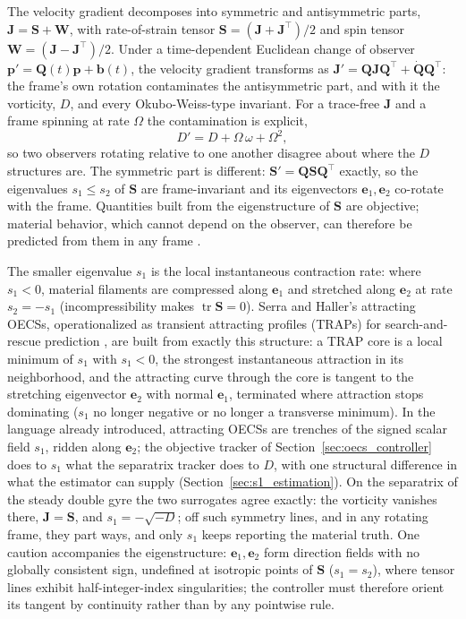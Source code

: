 \documentclass[lettersize,journal]{IEEEtran}
\begin{document}
The velocity gradient decomposes into symmetric and antisymmetric
parts, $\mathbf{J} = \mathbf{S} + \mathbf{W}$, with rate-of-strain
tensor $\mathbf{S} = (\mathbf{J} + \mathbf{J}^\top)/2$ and spin tensor
$\mathbf{W} = (\mathbf{J} - \mathbf{J}^\top)/2$. Under a time-dependent
Euclidean change of observer $\mathbf{p}' = \mathbf{Q}(t)\mathbf{p} +
\mathbf{b}(t)$, the velocity gradient transforms as $\mathbf{J}' =
\mathbf{Q}\mathbf{J}\mathbf{Q}^\top + \dot{\mathbf{Q}}\mathbf{Q}^\top$:
the frame's own rotation contaminates the antisymmetric part, and with
it the vorticity, $D$, and every Okubo-Weiss-type invariant. For a
trace-free $\mathbf{J}$ and a frame spinning at rate $\Omega$ the
contamination is explicit,
\begin{equation}
    D' = D + \Omega\,\omega + \Omega^2,
    \label{eq:D_not_objective}
\end{equation}
so two observers rotating relative to one another disagree about where
the $D$ structures are. The symmetric part is different:
$\mathbf{S}' = \mathbf{Q}\mathbf{S}\mathbf{Q}^\top$ exactly, so the
eigenvalues $s_1 \leq s_2$ of $\mathbf{S}$ are frame-invariant and its
eigenvectors $\mathbf{e}_1, \mathbf{e}_2$ co-rotate with the frame.
Quantities built from the eigenstructure of $\mathbf{S}$ are objective;
material behavior, which cannot depend on the observer, can therefore be
predicted from them in any frame \cite{16,17}.

The smaller eigenvalue $s_1$ is the local instantaneous contraction
rate: where $s_1 < 0$, material filaments are compressed along
$\mathbf{e}_1$ and stretched along $\mathbf{e}_2$ at rate $s_2 = -s_1$
(incompressibility makes $\operatorname{tr}\mathbf{S} = 0$). Serra and
Haller's attracting OECSs, operationalized as transient attracting
profiles (TRAPs) for search-and-rescue prediction \cite{17,36}, are
built from exactly this structure: a TRAP core is a local minimum of
$s_1$ with $s_1 < 0$, the strongest instantaneous attraction in its
neighborhood, and the attracting curve through the core is tangent to
the stretching eigenvector $\mathbf{e}_2$ with normal $\mathbf{e}_1$,
terminated where attraction stops dominating ($s_1$ no longer negative
or no longer a transverse minimum). In the language already introduced,
attracting OECSs are trenches of the signed scalar field $s_1$, ridden
along $\mathbf{e}_2$; the objective tracker of
Section~\ref{sec:oecs_controller} does to $s_1$ what the separatrix
tracker does to $D$, with one structural difference in what the
estimator can supply (Section~\ref{sec:s1_estimation}). On the
separatrix of the steady double gyre the two surrogates agree exactly:
the vorticity vanishes there, $\mathbf{J} = \mathbf{S}$, and
$s_1 = -\sqrt{-D}$; off such symmetry lines, and in any rotating frame,
they part ways, and only $s_1$ keeps reporting the material truth. One
caution accompanies the eigenstructure: $\mathbf{e}_1, \mathbf{e}_2$
form direction fields with no globally consistent sign, undefined at
isotropic points of $\mathbf{S}$ ($s_1 = s_2$), where tensor lines
exhibit half-integer-index singularities; the controller must therefore
orient its tangent by continuity rather than by any pointwise rule.
\end{document}
